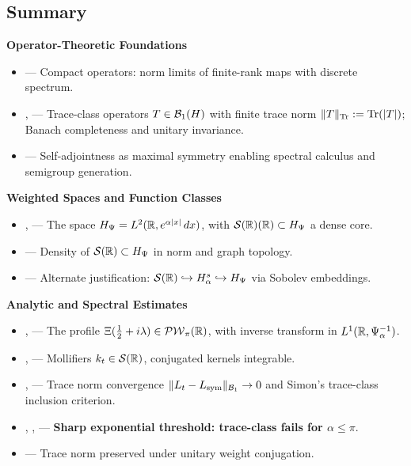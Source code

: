 \subsection*{Summary}
\label{sec:foundations_summary}

\textbf{Operator-Theoretic Foundations}
\begin{itemize}
  \item {} — Compact operators: norm limits of finite-rank maps with discrete spectrum.
  \item {},  — Trace-class operators \( T \in \mathcal{B}_1(H) \) with finite trace norm \( \|T\|_{\operatorname{Tr}} := \operatorname{Tr}(|T|) \); Banach completeness and unitary invariance.
  \item {} — Self-adjointness as maximal symmetry enabling spectral calculus and semigroup generation.
\end{itemize}

\textbf{Weighted Spaces and Function Classes}
\begin{itemize}
  \item {},  — The space \( H_{\Psi} = L^2(\mathbb{R}, e^{\alpha|x|}\,dx) \), with \( \mathcal{S}(\mathbb{R})(\mathbb{R}) \subset H_{\Psi} \) a dense core.
  \item {} — Density of \( \mathcal{S}(\mathbb{R}) \subset H_{\Psi} \) in norm and graph topology.
  \item {} — Alternate justification: \( \mathcal{S}(\mathbb{R}) \hookrightarrow H^s_\alpha \hookrightarrow H_{\Psi} \) via Sobolev embeddings.
\end{itemize}

\textbf{Analytic and Spectral Estimates}
\begin{itemize}
  \item {},  — The profile \( \Xi(\tfrac{1}{2} + i\lambda) \in \mathcal{PW}_{\pi}(\mathbb{R}) \), with inverse transform in \( L^1(\mathbb{R}, \Psi_\alpha^{-1}) \).
  \item {},  — Mollifiers \( k_t \in \mathcal{S}(\mathbb{R}) \), conjugated kernels integrable.
  \item {},  — Trace norm convergence \( \|L_t - L_{\mathrm{sym}}\|_{\mathcal{B}_1} \to 0 \) and Simon’s trace-class inclusion criterion.
  \item {}, ,  — \textbf{Sharp exponential threshold: trace-class fails for \( \alpha \le \pi \)}.
  \item {} — Trace norm preserved under unitary weight conjugation.
\end{itemize}

